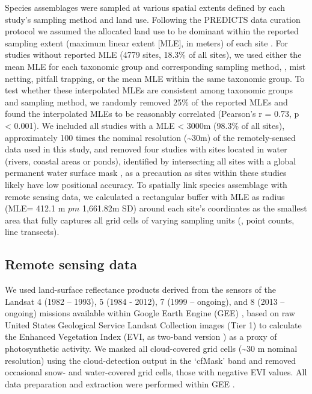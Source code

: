 Species assemblages were sampled at various spatial extents defined by each study’s sampling method and land use. Following the PREDICTS data curation protocol we assumed the allocated land use to be dominant within the reported sampling extent (maximum linear extent [MLE], in meters) of each site \citep{Hudson2014,Hudson2016}. For studies without reported MLE (4779 sites, 18.3\% of all sites), we used either the mean MLE for each taxonomic group and corresponding sampling method, \eg, mist netting, pitfall trapping, or the mean MLE within the same taxonomic group. To test whether these interpolated MLEs are consistent among taxonomic groups and sampling method, we randomly removed 25\% of the reported MLEs and found the interpolated MLEs to be reasonably correlated (Pearson’s r = 0.73, p < 0.001). We included all studies with a MLE < 3000m (98.3\% of all sites), approximately 100 times the nominal resolution (\textasciitilde 30m) of the remotely-sensed data used in this study, and removed four studies with sites located in water (rivers, coastal areas or ponds), identified by intersecting all sites with a global permanent water surface mask \citep{Pekel2016}, as a precaution as sites within these studies likely have low positional accuracy. To spatially link species assemblage with remote sensing data, we calculated a rectangular buffer with MLE as radius (MLE= 412.1 m $pm$ 1,661.82m SD) around each site’s coordinates as the smallest area that fully captures all grid cells of varying sampling units (\eg, point counts, line transects). 

\subsection{Remote sensing data} 
We used land-surface reflectance products derived from the sensors of the Landsat 4 (1982 – 1993), 5 (1984 - 2012), 7 (1999 – ongoing), and 8 (2013 – ongoing) missions available within Google Earth Engine (GEE) \citep{Gorelick2017}, based on raw United States Geological Service Landsat Collection images (Tier 1) to calculate the Enhanced Vegetation Index (EVI, as two-band version \cite{Jiang2008}) as a proxy of photosynthetic activity. We masked all cloud-covered grid cells (\textasciitilde 30 m nominal resolution) using the cloud-detection output in the ‘cfMask’ band \citep{Zhu2012} and removed occasional snow- and water-covered grid cells, \ie those with negative EVI values. All data preparation and extraction were performed within GEE \citep{Gorelick2017}.


